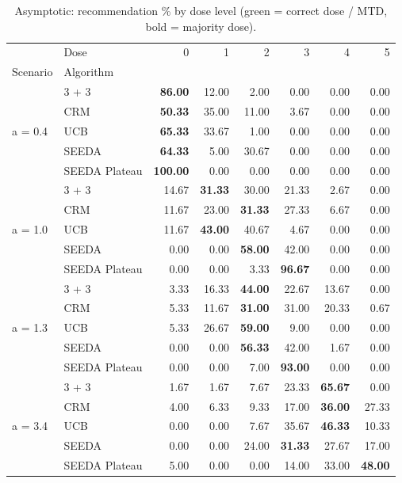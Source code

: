 \begin{table}
\centering
\caption{Asymptotic: recommendation \% by dose level (green = correct dose / MTD, bold = majority dose).}
\label{tab:asym_rec_by_dose}
\begin{tabular}{llrrrrrr}
\toprule
 & Dose & 0 & 1 & 2 & 3 & 4 & 5 \\
Scenario & Algorithm &  &  &  &  &  &  \\
\midrule
\multirow[c]{5}{*}{a = 0.4} & 3 + 3 & {\cellcolor[HTML]{C8E6C9}} \bfseries 86.00 & 12.00 & 2.00 & 0.00 & 0.00 & 0.00 \\
 & CRM & {\cellcolor[HTML]{C8E6C9}} \bfseries 50.33 & 35.00 & 11.00 & 3.67 & 0.00 & 0.00 \\
 & UCB & {\cellcolor[HTML]{C8E6C9}} \bfseries 65.33 & 33.67 & 1.00 & 0.00 & 0.00 & 0.00 \\
 & SEEDA & {\cellcolor[HTML]{C8E6C9}} \bfseries 64.33 & 5.00 & 30.67 & 0.00 & 0.00 & 0.00 \\
 & SEEDA Plateau & {\cellcolor[HTML]{C8E6C9}} \bfseries 100.00 & 0.00 & 0.00 & 0.00 & 0.00 & 0.00 \\
\multirow[c]{5}{*}{a = 1.0} & 3 + 3 & 14.67 & \bfseries 31.33 & 30.00 & {\cellcolor[HTML]{C8E6C9}} 21.33 & 2.67 & 0.00 \\
 & CRM & 11.67 & 23.00 & \bfseries 31.33 & {\cellcolor[HTML]{C8E6C9}} 27.33 & 6.67 & 0.00 \\
 & UCB & 11.67 & \bfseries 43.00 & 40.67 & {\cellcolor[HTML]{C8E6C9}} 4.67 & 0.00 & 0.00 \\
 & SEEDA & 0.00 & 0.00 & \bfseries 58.00 & {\cellcolor[HTML]{C8E6C9}} 42.00 & 0.00 & 0.00 \\
 & SEEDA Plateau & 0.00 & 0.00 & 3.33 & {\cellcolor[HTML]{C8E6C9}} \bfseries 96.67 & 0.00 & 0.00 \\
\multirow[c]{5}{*}{a = 1.3} & 3 + 3 & 3.33 & 16.33 & \bfseries 44.00 & {\cellcolor[HTML]{C8E6C9}} 22.67 & 13.67 & 0.00 \\
 & CRM & 5.33 & 11.67 & \bfseries 31.00 & {\cellcolor[HTML]{C8E6C9}} 31.00 & 20.33 & 0.67 \\
 & UCB & 5.33 & 26.67 & \bfseries 59.00 & {\cellcolor[HTML]{C8E6C9}} 9.00 & 0.00 & 0.00 \\
 & SEEDA & 0.00 & 0.00 & \bfseries 56.33 & {\cellcolor[HTML]{C8E6C9}} 42.00 & 1.67 & 0.00 \\
 & SEEDA Plateau & 0.00 & 0.00 & 7.00 & {\cellcolor[HTML]{C8E6C9}} \bfseries 93.00 & 0.00 & 0.00 \\
\multirow[c]{5}{*}{a = 3.4} & 3 + 3 & 1.67 & 1.67 & 7.67 & 23.33 & \bfseries 65.67 & {\cellcolor[HTML]{C8E6C9}} 0.00 \\
 & CRM & 4.00 & 6.33 & 9.33 & 17.00 & \bfseries 36.00 & {\cellcolor[HTML]{C8E6C9}} 27.33 \\
 & UCB & 0.00 & 0.00 & 7.67 & 35.67 & \bfseries 46.33 & {\cellcolor[HTML]{C8E6C9}} 10.33 \\
 & SEEDA & 0.00 & 0.00 & 24.00 & \bfseries 31.33 & 27.67 & {\cellcolor[HTML]{C8E6C9}} 17.00 \\
 & SEEDA Plateau & 5.00 & 0.00 & 0.00 & 14.00 & 33.00 & {\cellcolor[HTML]{C8E6C9}} \bfseries 48.00 \\
\bottomrule
\end{tabular}
\end{table}
